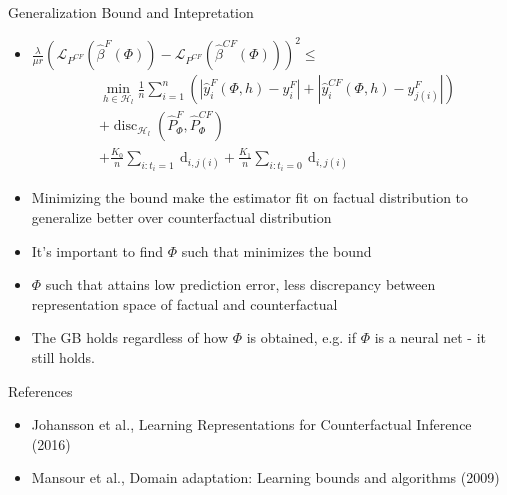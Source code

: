 \documentclass{beamer}
\begin{document}
	\begin{frame}{Generalization Bound and Intepretation}
		\begin{itemize}
			\item $\frac{\lambda}{\mu r}\left(\mathcal{L}_{P^{CF}}\left(\hat{\beta}^{F}(\Phi)\right)-\mathcal{L}_{P^{CF}}\left(\hat{\beta}^{C F}(\Phi)\right)\right)^{2} \leq$
			\begin{align}
			&\min _{h \in \mathcal{H}_{l}} \frac{1}{n} \sum_{i=1}^{n}\left(\left|\hat{y}_{i}^{F}(\Phi, h)-y_{i}^{F}\right|+\left|\hat{y}_{i}^{C F}(\Phi, h)-y_{j(i)}^{F}\right|\right) \\
			&+ \operatorname{disc}_{\mathcal{H}_{l}}\left(\hat{P}_{\Phi}^{F}, \hat{P}_{\Phi}^{C F}\right)  \\
			&+ \frac{K_{0}}{n} \sum_{i: t_{i}=1} \mathrm{~d}_{i, j(i)}+\frac{K_{1}}{n} \sum_{i: t_{i}=0} \mathrm{~d}_{i, j(i)}
			\end{align}
			\item Minimizing the bound make the estimator fit on factual distribution to generalize better over counterfactual distribution
			\item It's important to find $\Phi$ such that minimizes the bound
			\item $\Phi$ such that attains low prediction error, less discrepancy between representation space of factual and counterfactual
			\item The GB holds regardless of how $\Phi$ is obtained, e.g. if $\Phi$ is a neural net - it still holds.
		\end{itemize}
	\end{frame}

	\begin{frame}{References}
		\begin{itemize}
			\item Johansson et al., Learning Representations for Counterfactual Inference (2016)
			\item Mansour et al., Domain adaptation: Learning bounds and algorithms (2009)
		\end{itemize}
	\end{frame}
\end{document}

